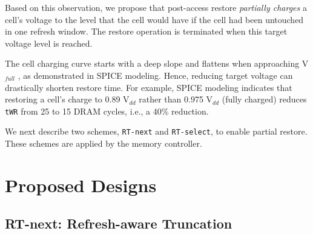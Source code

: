 Based on this observation, we propose that post-access restore {\em partially charges} a cell's voltage to the level that the cell would have if the cell had been untouched in one refresh window. The restore operation is terminated when this target voltage level is reached. 

The cell charging curve starts with a deep slope and flattens when approaching V$_{full}$ \cite{HPCA15:aldram, PATENT11:dram}, as demonstrated in SPICE modeling. Hence, reducing target voltage can drastically shorten restore time. For example, SPICE modeling indicates that restoring a cell's charge to 0.89 V$_{dd}$ rather than 0.975 V$_{dd}$ (fully charged) reduces {\tt tWR} from 25 to 15 DRAM cycles, i.e., a 40\% reduction.

We next describe two schemes, {\tt RT-next} and {\tt RT-select}, to enable partial restore.  These schemes are applied by the memory controller.

\section{Proposed Designs}
\subsection{RT-next: Refresh-aware Truncation}

